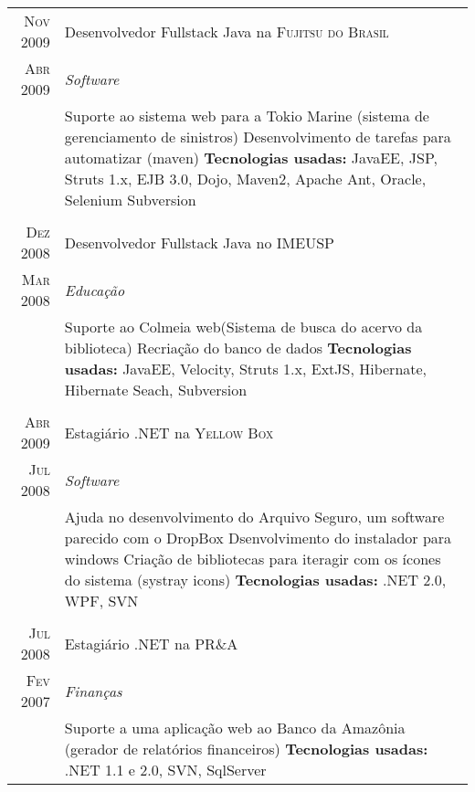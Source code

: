 \documentclass[a4paper,10pt]{article}
\begin{document}
\begin{tabular}{r|p{11cm}}
\textsc{Nov 2009} & Desenvolvedor Fullstack Java na \textsc{Fujitsu do Brasil}\\
\textsc{Abr 2009}&\emph{Software}\\&\footnotesize{  Suporte ao sistema web para a Tokio Marine (sistema de gerenciamento de sinistros)\newline
                          Desenvolvimento de tarefas para automatizar (maven)\newline
\textbf{Tecnologias usadas:} JavaEE, JSP, Struts 1.x, EJB 3.0, Dojo, Maven2, Apache Ant, Oracle, Selenium Subversion
 }\\\multicolumn{2}{c}{} \\ 
 \textsc{Dez 2008} & Desenvolvedor Fullstack Java no \textsc{IMEUSP} \\\textsc{Mar 2008} &\emph{Educação}\\&\footnotesize{ Suporte ao Colmeia web(Sistema de busca do acervo da biblioteca)\newline
                          Recriação do banco de dados\newline
\textbf{Tecnologias usadas:} JavaEE, Velocity, Struts 1.x, ExtJS, Hibernate, Hibernate Seach, Subversion
 }\\\multicolumn{2}{c}{} \\
 
\textsc{Abr 2009} & Estagiário .NET na \textsc{Yellow Box}\\
\textsc{Jul 2008}&\emph{Software}\\&\footnotesize{ Ajuda no desenvolvimento do Arquivo Seguro, um software parecido com o DropBox\newline
   Dsenvolvimento do instalador para windows\newline
   Criação de bibliotecas para iteragir com os ícones do sistema (systray icons)\newline
\textbf{Tecnologias usadas:} .NET 2.0, WPF, SVN
 }\\\multicolumn{2}{c}{} \\
 \textsc{Jul 2008} & Estagiário .NET na \textsc{PR\&A} \\\textsc{Fev 2007}&\emph{Finanças}\\&\footnotesize{  Suporte a uma aplicação web ao Banco da Amazônia (gerador de relatórios financeiros) \newline
\textbf{Tecnologias usadas:} .NET 1.1 e 2.0, SVN, SqlServer
 }
\end{tabular}



\newpage
\end{document}
